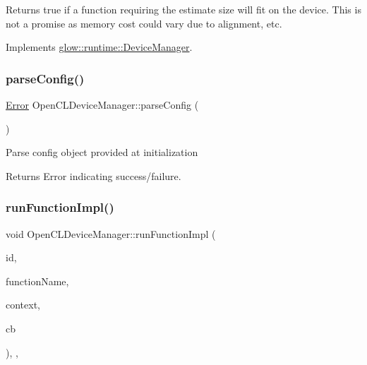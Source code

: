 Returns true if a function requiring the {\ttfamily estimate} size will fit on the device. This is not a promise as memory cost could vary due to alignment, etc. 

Implements \hyperlink{classglow_1_1runtime_1_1_device_manager_ae9bba4abda9cb6aa1359a69e942feb22}{glow\+::runtime\+::\+Device\+Manager}.

\mbox{\label{classglow_1_1runtime_1_1_open_c_l_device_manager_af95560876335be09bca28b465d895687}} 
\subsubsection{\texorpdfstring{parse\+Config()}{parseConfig()}}
{\footnotesize\ttfamily \hyperlink{namespaceglow_afdb176c3a672ef66db0ecfc19a8d39bf}{Error} Open\+C\+L\+Device\+Manager\+::parse\+Config (\begin{DoxyParamCaption}{ }\end{DoxyParamCaption})}

Parse config object provided at initialization \begin{DoxyReturn}{Returns}
Error indicating success/failure. 
\end{DoxyReturn}
\mbox{\label{classglow_1_1runtime_1_1_open_c_l_device_manager_a1c5fc269e46e652747d1df4e90a5317e}} 
\subsubsection{\texorpdfstring{run\+Function\+Impl()}{runFunctionImpl()}}
{\footnotesize\ttfamily void Open\+C\+L\+Device\+Manager\+::run\+Function\+Impl (\begin{DoxyParamCaption}\item[{runtime\+::\+Run\+Identifier\+Ty}]{id,  }\item[{std\+::string}]{function\+Name,  }\item[{std\+::unique\+\_\+ptr$<$ \hyperlink{classglow_1_1_execution_context}{Execution\+Context} $>$}]{context,  }\item[{Result\+C\+B\+Ty}]{cb }\end{DoxyParamCaption})\hspace{0.3cm}{\ttfamily [override]}, {\ttfamily [protected]}, {\ttfamily [virtual]}}

